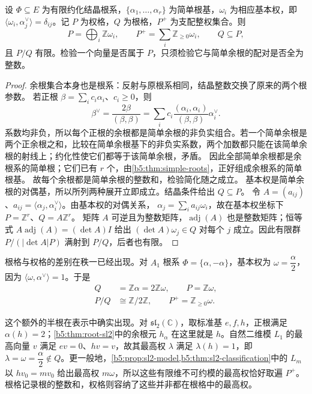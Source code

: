 \begin{proposition}\label{b5:prop:weight-fundamental-basis}
	设 \(\Phi\subseteq E\) 为有限约化结晶根系，\(\{\alpha_1,\ldots,\alpha_r\}\) 为简单根基，\(\omega_i\) 为相应基本权，即 \(\langle\omega_i,\alpha_j^\vee\rangle=\delta_{ij}\)。记 \(P\) 为权格，\(Q\) 为根格，\(P^+\) 为支配整权集合。则
	\[
		P=\bigoplus_i\mathbb Z\omega_i,\qquad P^+=\sum_i\mathbb Z_{\geq0}\omega_i,\qquad Q\subseteq P,
	\]
	且 \(P/Q\) 有限。检验一个向量是否属于 \(P\)，只须检验它与简单余根的配对是否全为整数。
\end{proposition}
\begin{proof}
	余根集合本身也是根系：反射与原根系相同，结晶整数交换了原来的两个根参数。 若正根 \(\beta=\sum_i c_i\alpha_i\)、\(c_i\ge0\)，则
	\[
		\beta^\vee=\frac{2\beta}{(\beta,\beta)} =\sum_i c_i\frac{(\alpha_i,\alpha_i)}{(\beta,\beta)}\alpha_i^\vee.
	\]
	系数均非负，所以每个正根的余根都是简单余根的非负实组合。若一个简单余根是两个正余根之和，比较在简单余根基下的非负实系数，两个加数都只能在该简单余根的射线上；约化性使它们都等于该简单余根，矛盾。 因此全部简单余根都是余根系的简单根；它们已有 \(r\) 个，由\cref{b5:thm:simple-roots}，正好组成余根系的简单根基。 故每个余根都是简单余根的整数和，检验简化随之成立。 基本权是简单余根的对偶基，所以所列两种展开立即成立。结晶条件给出 \(Q\subseteq P\)。 令 \(A=(a_{ij})\)、\(a_{ij}=\langle\alpha_j,\alpha_i^\vee\rangle\)。由基本权的对偶关系， \(\alpha_j=\sum_i a_{ij}\omega_i\)，故在基本权坐标下 \(P=\mathbb Z^r\)、\(Q=A\mathbb Z^r\)。 矩阵 \(A\) 可逆且为整数矩阵，\(\operatorname{adj}(A)\) 也是整数矩阵；恒等式 \(A\operatorname{adj}(A)=(\det A)I\) 给出 \((\det A)\omega_j\in Q\) 对每个 \(j\) 成立。因此有限群 \(P/(|\det A|P)\) 满射到 \(P/Q\)，后者也有限。
\end{proof}

根格与权格的差别在秩一已经出现。对 \(A_1\) 根系 \(\Phi=\{\alpha,-\alpha\}\)，基本权为 \(\omega=\dfrac{\alpha}{2}\)，因为 \(\langle\omega,\alpha^\vee\rangle=1\)。于是
\[
	\begin{aligned}
		Q&=\mathbb Z\alpha=2\mathbb Z\omega,\qquad P=\mathbb Z\omega,\\
		P/Q&\cong\mathbb Z/2\mathbb Z,\qquad P^+=\mathbb Z_{\ge0}\omega.
	\end{aligned}
\]

\ProseParagraphBreak

这个额外的半根在表示中确实出现。对 \(\mathfrak{sl}_2(\mathbb C)\)，取标准基 \(e,f,h\)，正根满足 \(\alpha(h)=2\)；\cref{b5:thm:root-sl2}中的余根元 \(h_\alpha\) 在这里就是 \(h\)。自然二维模 \(L_1\) 的最高向量 \(v\) 满足 \(ev=0\)、\(hv=v\)，故其最高权 \(\lambda\) 满足 \(\lambda(h)=1\)，即 \(\lambda=\omega=\dfrac{\alpha}{2}\notin Q\)。更一般地，\cref{b5:prop:sl2-model,b5:thm:sl2-classification}中的 \(L_m\) 以 \(hv_0=mv_0\) 给出最高权 \(m\omega\)，所以这些有限维不可约模的最高权恰好取遍 \(P^+\)。根格记录根的整数和，权格则容纳了这些并非都在根格中的最高权。

